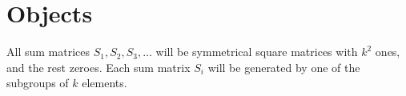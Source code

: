 \documentclass[a4paper]{article}
\begin{document}
\section{Objects}
\label{sec:objects}

All sum matrices $S_1, S_2, S_3, \ldots$ will be symmetrical square matrices with $k^2$ ones, and the rest zeroes.
Each sum matrix $S_i$ will be generated by one of the subgroups of $k$ elements.




\begin{comment}
The program contains three matrix-type objects, which we call $O$ (for occurrences),
$P$ (for pairs), 
and $R$ (for results).
They are described in turn.

\begin{table}[!tbp]
\begin{center}
\begin{tabular}{rrrrr}
\hline\hline
\multicolumn{1}{c}{}&\multicolumn{1}{c}{}&\multicolumn{1}{c}{}&\multicolumn{1}{c}{}&\multicolumn{1}{c}{}\tabularnewline
\hline
$1$&$ 6$&$1$&$ 6$&$1$\tabularnewline
$2$&$ 7$&$2$&$ 7$&$2$\tabularnewline
$3$&$ 8$&$3$&$ 8$&$3$\tabularnewline
$4$&$ 9$&$4$&$ 9$&$4$\tabularnewline
$5$&$10$&$5$&$10$&$5$\tabularnewline
\hline
\end{tabular}
\end{center}
\end{table}

\subsection{O: occurrences}
\label{ssec:occurr}

This object is a two-dimensional matrix with two rows and $n$ columns.
$O$ tracks two counts of occurrences associated to each of the $n$ elements.
Table~\ref{tab:O_0} shows the initial state of $O$.
Of course, all the occurrences are equal to $0$ at this point.
Note that $O$ has two rows:
In row 0 of $O$ ($O[0,]$), all the occurrences of element $i$ in $R$ (see section~\ref{ssect:R}) are counted.
In row 1 ($O[1,]$) we count in how many of the $n-1$ pairs in which an element can appear, it has already appeared.
(NB: We do not count the pair of an element with itself.)


\end{comment}
\end{document}
